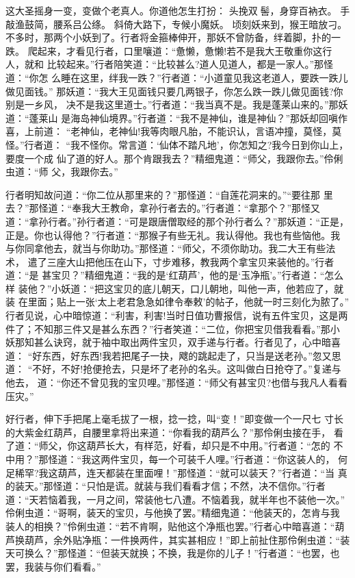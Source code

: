 这大圣摇身一变，变做个老真人。你道他怎生打扮：
头挽双髻，身穿百衲衣。
手敲渔鼓简，腰系吕公绦。
斜倚大路下，专候小魔妖。
顷刻妖来到，猴王暗放刁。
不多时，那两个小妖到了。行者将金箍棒伸开，那妖不曾防备，绊着脚，扑的一跌。
爬起来，才看见行者，口里嚷道：“惫懒，惫懒!若不是我大王敬重你这行人，就和
比较起来。”行者陪笑道：“比较甚么?道人见道人，都是一家人。”那怪道：“你怎
么睡在这里，绊我一跌？”行者道：“小道童见我这老道人，要跌一跌儿做见面钱。”
那妖道：“我大王见面钱只要几两银子，你怎么跌一跌儿做见面钱?你别是一乡风，
决不是我这里道士。”行者道：“我当真不是。我是蓬莱山来的。”那妖道：“蓬莱山
是海岛神仙境界。”行者道：“我不是神仙，谁是神仙？”那妖却回嗔作喜，上前道：
“老神仙，老神仙!我等肉眼凡胎，不能识认，言语冲撞，莫怪，莫怪。”行者道：
“我不怪你。常言道：‘仙体不踏凡地’，你怎知之?我今日到你山上，要度一个成
仙了道的好人。那个肯跟我去？”精细鬼道：“师父，我跟你去。”伶俐虫道：“师
父，我跟你去。”

行者明知故问道：“你二位从那里来的？”那怪道：“自莲花洞来的。”“要往那
里去？”那怪道：“奉我大王教命，拿孙行者去的。”行者道：“拿那个？”那怪又
道：“拿孙行者。”孙行者道：“可是跟唐僧取经的那个孙行者么？”那妖道：“正是，
正是。你也认得他？”行者道：“那猴子有些无礼。我认得他。我也有些恼他。我
与你同拿他去，就当与你助功。”那怪道：“师父，不须你助功。我二大王有些法术，
遣了三座大山把他压在山下，寸步难移，教我两个拿宝贝来装他的。”行者道：“是
甚宝贝？”精细鬼道：“我的是‘红葫芦’，他的是‘玉净瓶’。”行者道：“怎么样
装他？”小妖道：“把这宝贝的底儿朝天，口儿朝地，叫他一声，他若应了，就装
在里面；贴上一张‘太上老君急急如律令奉敕’的帖子，他就一时三刻化为脓了。”
行者见说，心中暗惊道：“利害，利害!当时日值功曹报信，说有五件宝贝，这是两
件了；不知那三件又是甚么东西？”行者笑道：“二位，你把宝贝借我看看。”那小
妖那知甚么诀窍，就于袖中取出两件宝贝，双手递与行者。行者见了，心中暗喜道：
“好东西，好东西!我若把尾子一抉，飕的跳起走了，只当是送老孙。”忽又思道：
“不好，不好!抢便抢去，只是坏了老孙的名头。这叫做白日抢夺了。”复递与他去，
道：“你还不曾见我的宝贝哩。”那怪道：“师父有甚宝贝?也借与我凡人看看压灾。”

好行者，伸下手把尾上毫毛拔了一根，捻一捻，叫“变！”即变做一个一尺七
寸长的大紫金红葫芦，自腰里拿将出来道：“你看我的葫芦么？”那伶俐虫接在手，
看了道：“师父，你这葫芦长大，有样范，好看，却只是不中用。”行者道：“怎的
不中用？”那怪道：“我这两件宝贝，每一个可装千人哩。”行者道：“你这装人的，
何足稀罕?我这葫芦，连天都装在里面哩！”那怪道：“就可以装天？”行者道：“当
真的装天。”那怪道：“只怕是谎。就装与我们看看才信；不然，决不信你。”行者
道：“天若恼着我，一月之间，常装他七八遭。不恼着我，就半年也不装他一次。”
伶俐虫道：“哥啊，装天的宝贝，与他换了罢。”精细鬼道：“他装天的，怎肯与我
装人的相换？”伶俐虫道：“若不肯啊，贴他这个净瓶也罢。”行者心中暗喜道：“葫
芦换葫芦，余外贴净瓶：一件换两件，其实甚相应！”即上前扯住那伶俐虫道：“装
天可换么？”那怪道：“但装天就换；不换，我是你的儿子！”行者道：“也罢，也
罢，我装与你们看看。”


